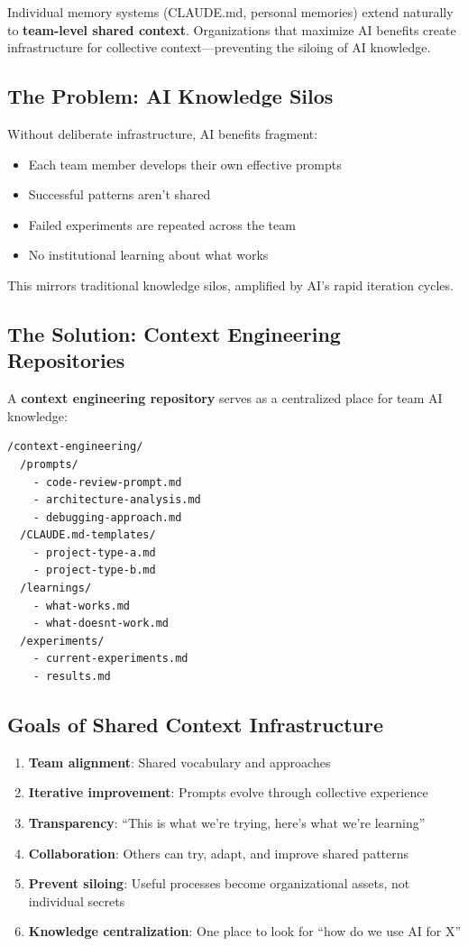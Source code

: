 Individual memory systems (CLAUDE.md, personal memories) extend naturally to \textbf{team-level shared context}. Organizations that maximize AI benefits create infrastructure for collective context---preventing the siloing of AI knowledge.

\subsection{The Problem: AI Knowledge Silos}

Without deliberate infrastructure, AI benefits fragment:
\begin{itemize}
    \item Each team member develops their own effective prompts
    \item Successful patterns aren't shared
    \item Failed experiments are repeated across the team
    \item No institutional learning about what works
\end{itemize}

This mirrors traditional knowledge silos, amplified by AI's rapid iteration cycles.

\subsection{The Solution: Context Engineering Repositories}

A \textbf{context engineering repository} serves as a centralized place for team AI knowledge:

\begin{lstlisting}
/context-engineering/
  /prompts/
    - code-review-prompt.md
    - architecture-analysis.md
    - debugging-approach.md
  /CLAUDE.md-templates/
    - project-type-a.md
    - project-type-b.md
  /learnings/
    - what-works.md
    - what-doesnt-work.md
  /experiments/
    - current-experiments.md
    - results.md
\end{lstlisting}

\subsection{Goals of Shared Context Infrastructure}

\begin{enumerate}
    \item \textbf{Team alignment}: Shared vocabulary and approaches
    \item \textbf{Iterative improvement}: Prompts evolve through collective experience
    \item \textbf{Transparency}: ``This is what we're trying, here's what we're learning''
    \item \textbf{Collaboration}: Others can try, adapt, and improve shared patterns
    \item \textbf{Prevent siloing}: Useful processes become organizational assets, not individual secrets
    \item \textbf{Knowledge centralization}: One place to look for ``how do we use AI for X''
\end{enumerate}


